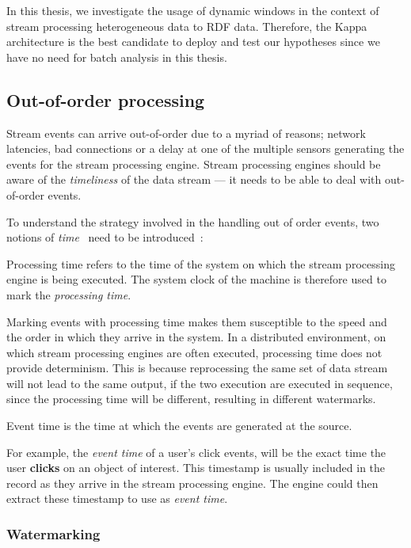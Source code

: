 In this thesis, we investigate the usage of dynamic windows in the context of stream processing 
heterogeneous data to RDF data. 
Therefore, the Kappa architecture is the best candidate to deploy and test our 
hypotheses since we have no need for batch analysis in this thesis.  

\subsection{Out-of-order processing}%
\label{sub:Out of order processing}
Stream events can arrive out-of-order due to a myriad of reasons; network latencies, 
bad connections or a delay at one of the multiple sensors generating the events for 
the stream processing engine. Stream 
processing engines should be aware of the \emph{timeliness} of the data stream --- it needs 
to be able to deal with out-of-order events. 

To understand the strategy involved in the handling out of order events, 
two notions of \emph{time}~ need to be introduced~\cite{watermark_flink}:  

\begin{defn}
    Processing time refers to the time of the system on which the stream processing 
    engine is being executed. The system clock of the machine is therefore used 
    to mark the \emph{processing time}. 
\end{defn}
Marking events with processing time makes them 
susceptible to the speed and the order in which they arrive in the system. 
In a distributed environment, on which stream processing engines are often 
executed, processing time does not provide determinism. This is because 
reprocessing the same set of data stream will not lead to the same output, if 
the two execution are executed in sequence, since the processing time will be 
different, resulting in different watermarks. 


\begin{defn}
    Event time is the time at which the events are generated at the source.
\end{defn}
For example, the \emph{event time} of a user's click events,
will be the exact time the user \textbf{clicks} on an object of 
interest. This timestamp is usually included in the record as they arrive 
in the stream processing engine. The engine could then extract these 
timestamp to use as \emph{event time}. 


\subsubsection{Watermarking}%
\label{ssub:Watermarking}

